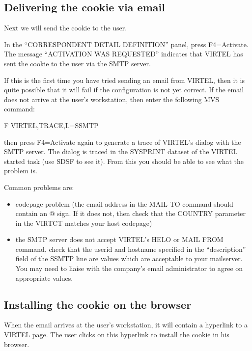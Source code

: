 \documentclass[letterpaper,10pt,english]{sphinxmanual}
\begin{document}
\subsection{Delivering the cookie via e\sphinxhyphen{}mail}
\label{\detokenize{connectivity_guide:delivering-the-cookie-via-e-mail}}
\sphinxAtStartPar
Next we will send the cookie to the user.

\sphinxAtStartPar
In the “CORRESPONDENT DETAIL DEFINITION” panel, press F4=Activate. The message “ACTIVATION WAS REQUESTED” indicates that VIRTEL has sent the cookie to the user via the SMTP server.

\sphinxAtStartPar
If this is the first time you have tried sending an e\sphinxhyphen{}mail from VIRTEL, then it is quite possible that it will fail if the configuration is not yet correct.  If the e\sphinxhyphen{}mail does not arrive at the user’s workstation, then enter the following MVS command:

\sphinxAtStartPar
F VIRTEL,TRACE,L=S\sphinxhyphen{}SMTP

\sphinxAtStartPar
then press F4=Activate again to generate a trace of VIRTEL’s dialog with the SMTP server.  The dialog is traced in the SYSPRINT dataset of the VIRTEL started task (use SDSF to see it). From this you should be able to see what the problem is.

\sphinxAtStartPar
Common problems are:
\begin{itemize}
\item {} 
\sphinxAtStartPar
codepage problem (the e\sphinxhyphen{}mail address in the MAIL TO command should contain an @ sign. If it does not, then check that the COUNTRY parameter in the VIRTCT matches your host codepage)

\item {} 
\sphinxAtStartPar
the SMTP server does not accept VIRTEL’s HELO or MAIL FROM command, check that the userid and hostname specified in the “description” field of the S\sphinxhyphen{}SMTP line are values which are acceptable to your mailserver.  You may need to liaise with the company’s e\sphinxhyphen{}mail administrator to agree on appropriate values.

\end{itemize}


\subsection{Installing the cookie on the browser}
\label{\detokenize{connectivity_guide:installing-the-cookie-on-the-browser}}
\sphinxAtStartPar
When the e\sphinxhyphen{}mail arrives at the user’s workstation, it will contain a hyperlink to a VIRTEL page.  The user clicks on this hyperlink to install the cookie in his browser.
\end{document}
